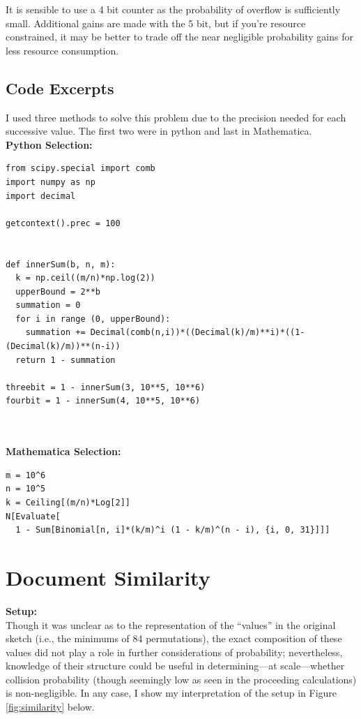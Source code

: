 \documentclass[conference]{styles/acmsiggraph}
\newcommand{\?}{\stackrel{?}{=}}
\begin{document}
It is sensible to use a 4 bit counter as the probability of overflow is sufficiently small.  Additional gains are made with the 5 bit, but if you're resource constrained, it may be better to trade off the near negligible probability gains for less resource consumption.

\subsection{Code Excerpts}
I used three methods to solve this problem due to the precision needed for each successive value.  The first two were in python and last in Mathematica.\\

\textbf{Python Selection:}
\begin{verbatim}
from scipy.special import comb
import numpy as np
import decimal

getcontext().prec = 100


def innerSum(b, n, m):
  k = np.ceil((m/n)*np.log(2))
  upperBound = 2**b
  summation = 0
  for i in range (0, upperBound):
    summation += Decimal(comb(n,i))*((Decimal(k)/m)**i)*((1-(Decimal(k)/m))**(n-i))
  return 1 - summation
  
threebit = 1 - innerSum(3, 10**5, 10**6)
fourbit = 1 - innerSum(4, 10**5, 10**6)
\end{verbatim}

\textbf{\\ \\Mathematica Selection:}
\begin{verbatim}
m = 10^6
n = 10^5
k = Ceiling[(m/n)*Log[2]]
N[Evaluate[
  1 - Sum[Binomial[n, i]*(k/m)^i (1 - k/m)^(n - i), {i, 0, 31}]]]
\end{verbatim}


\newpage

\section{Document Similarity}
\textbf{Setup:}\\
Though it was unclear as to the representation of the \enquote{values} in the original sketch (i.e., the minimums of 84 permutations), the exact composition of these values did not play a role in further considerations of probability; nevertheless, knowledge of their structure could be useful in determining---at scale---whether collision probability (though seemingly low as seen in the proceeding calculations) is non-negligible.  In any case, I show my interpretation of the setup in Figure \ref{fig:similarity} below.
\end{document}
